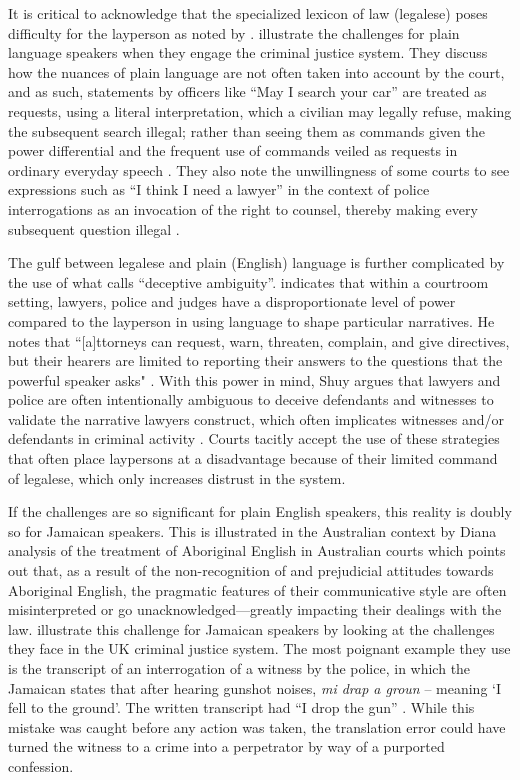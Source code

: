 \documentclass[output=paper,colorlinks,citecolor=brown]{langscibook}
\begin{document}
It is critical to acknowledge that the specialized lexicon of law (legalese) poses difficulty for the layperson as noted by \citet{Shuy2017}. \citet{SolanTiersma2005} illustrate the challenges for plain language speakers when they engage the criminal justice system. They discuss how the nuances of plain language are not often taken into account by the court, and as such, statements by officers like “May I search your car” are treated as requests, using a literal interpretation, which a civilian may legally refuse, making the subsequent search illegal; rather than seeing them as commands given the power differential and the frequent use of commands veiled as requests in ordinary everyday speech \citep[32--42]{SolanTiersma2005}. They also note the unwillingness of some courts to see expressions such as “I think I need a lawyer” in the context of police interrogations as an invocation of the right to counsel, thereby making every subsequent question illegal \citep[58]{SolanTiersma2005}.

The gulf between legalese and plain (English) language is further complicated by the use of what \citet{Shuy2017} calls “deceptive ambiguity”. \citet{Shuy2017} indicates that within a courtroom setting, lawyers, police and judges have a disproportionate level of power compared to the layperson in using language to shape particular narratives. He notes that “[a]ttorneys can request, warn, threaten, complain, and give directives, but their hearers are limited to reporting their answers to the questions that the powerful speaker asks" \citep[44]{Shuy2017}. With this power in mind, Shuy argues that lawyers and police are often intentionally ambiguous to deceive defendants and witnesses to validate the narrative lawyers construct, which often implicates witnesses and/or defendants in criminal activity \citep[59--60]{Shuy2017}. Courts tacitly accept the use of these strategies that often place laypersons at a disadvantage because of their limited command of legalese, which only increases distrust in the system.

If the challenges are so significant for plain English speakers, this reality is doubly so for Jamaican speakers. This is illustrated in the Australian context by Diana  analysis of the treatment of Aboriginal English in Australian courts which points out that, as a result of the non-recognition of and prejudicial attitudes towards Aboriginal English, the pragmatic features of their communicative style are often misinterpreted or go unacknowledged—greatly impacting their dealings with the law. \citet{Brown-BlakeChambers2007} illustrate this challenge for Jamaican speakers by looking at the challenges they face in the UK criminal justice system. The most poignant example they use is the transcript of an interrogation of a witness by the police, in which the Jamaican states that after hearing gunshot noises, \textit{mi drap a groun} -- meaning `I fell to the ground'. The written transcript had “I drop the gun” \citep[276--277]{Brown-BlakeChambers2007}. While this mistake was caught before any action was taken, the translation error could have turned the witness to a crime into a perpetrator by way of a purported confession.
\end{document}
